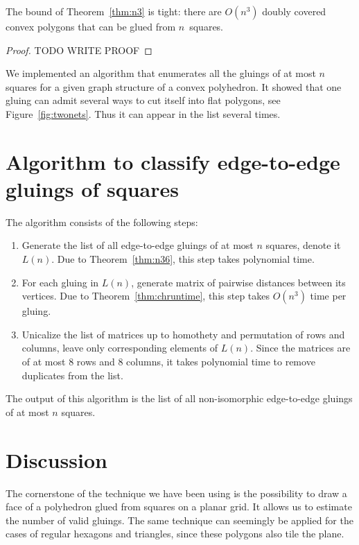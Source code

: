 \documentclass[a4paper,11pt]{article}
\begin{document}
\begin{theorem}
	The bound of Theorem~\ref{thm:n3} is tight: there are $O(n^3)$ doubly covered convex polygons that can be glued from $n$~squares.
\end{theorem}

\begin{proof}
	TODO WRITE PROOF
\end{proof}

We implemented an algorithm that enumerates all the gluings of at most $n$ squares for a given graph structure of a convex polyhedron. It showed that one gluing can admit several ways to cut itself into flat polygons, see Figure~\ref{fig:twonets}. Thus it can appear in the list several times.



\section{Algorithm to classify edge-to-edge gluings of squares}

The algorithm consists of the following steps:

\begin{enumerate}
	\item Generate the list of all edge-to-edge gluings of at most $n$ squares,
	denote it $L(n)$. Due to Theorem~\ref{thm:n36}, this step takes polynomial time.
	\item For each gluing in $L(n)$, generate matrix of pairwise distances
	between its vertices. Due to Theorem~\ref{thm:chruntime},
	this step takes $O(n^3)$ time per gluing.
	\item Unicalize the list of matrices up to homothety and permutation of rows and columns, leave only corresponding elements of $L(n)$. Since the matrices are of at most 8 rows and 8 columns, it takes polynomial time to remove duplicates from the list.
\end{enumerate}

The output of this algorithm is the list of all non-isomorphic edge-to-edge gluings of at most $n$ squares.

\section{Discussion}

The cornerstone of the technique we have been using is the possibility to draw a face of a polyhedron glued from squares on a planar grid. It allows us to estimate the number of valid gluings. The same technique can seemingly be applied for the cases of regular hexagons and triangles, since these polygons also tile the plane.
\end{document}
